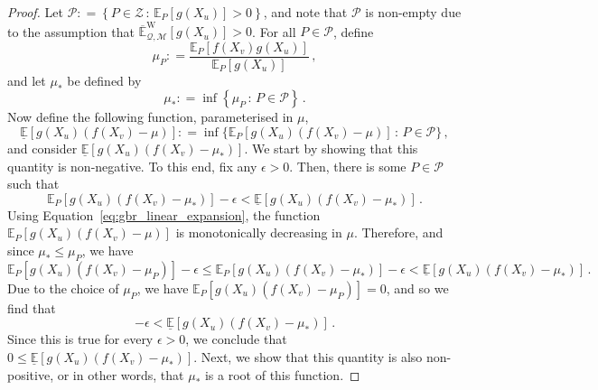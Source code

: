 \documentclass[twoside,11pt]{article}
\newcommand{\uexp}{\overline{\mathbb{E}}_{\rateset,\mathcal{M}}^\mathrm{W}}
\newcommand{\rateset}{\mathcal{Q}}
\newcommand{\coloneqq}{:\!=}
\begin{document}
\begin{proof}
Let $\mathcal{P}\coloneqq \left\{ P\in\mathcal{Z}\,:\, \mathbb{E}_P[g(X_u)] > 0\right\}$, and note that $\mathcal{P}$ is non-empty due to the assumption that $\uexp[g(X_u)]>0$. For all $P\in\mathcal{P}$, define
\begin{equation*}
\mu_P \coloneqq \frac{\mathbb{E}_P[f(X_v)g(X_u)]}{\mathbb{E}_P[g(X_u)]}\,,
\end{equation*}
and let $\mu_*$ be defined by
\begin{equation*}
\mu_* \coloneqq \inf\left\{\mu_P\,:\,P\in\mathcal{P} \right\}\,.
\end{equation*}
Now define the following function, parameterised in $\mu$,
\begin{equation*}
\underline{\mathbb{E}}[g(X_u)(f(X_v) - \mu)] \coloneqq \inf\{\mathbb{E}_P[g(X_u)(f(X_v) - \mu)]\,:\,P\in\mathcal{P} \}\,,
\end{equation*}
and consider $\underline{\mathbb{E}}[g(X_u)(f(X_v) - \mu_*)]$. We start by showing that this quantity is non-negative. To this end, fix any $\epsilon>0$. Then, there is some $P\in\mathcal{P}$ such that
\begin{equation*}
\mathbb{E}_P[g(X_u)(f(X_v) - \mu_*)] - \epsilon < \underline{\mathbb{E}}[g(X_u)(f(X_v) - \mu_*)]\,.
\end{equation*}
Using Equation~\eqref{eq:gbr_linear_expansion}, the function $\mathbb{E}_P[g(X_u)(f(X_v) - \mu)]$ is monotonically decreasing in $\mu$. Therefore, and since $\mu_*\leq \mu_P$, we have
\begin{equation*}
\mathbb{E}_P[g(X_u)(f(X_v) - \mu_P)] - \epsilon \leq \mathbb{E}_P[g(X_u)(f(X_v) - \mu_*)] - \epsilon < \underline{\mathbb{E}}[g(X_u)(f(X_v) - \mu_*)]\,.
\end{equation*}
Due to the choice of $\mu_P$, we have $\mathbb{E}_P[g(X_u)(f(X_v) - \mu_P)]=0$, and so we find that
\begin{equation*}
-\epsilon < \underline{\mathbb{E}}[g(X_u)(f(X_v) - \mu_*)]\,.
\end{equation*}
Since this is true for every $\epsilon>0$, we conclude that $0\leq \underline{\mathbb{E}}[g(X_u)(f(X_v) - \mu_*)]$. Next, we show that this quantity is also non-positive, or in other words, that $\mu_*$ is a root of this function. 


\end{proof}
\end{document}
